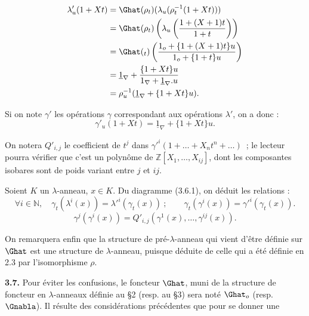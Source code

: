 \[
\begin{aligned}
\lambda'_u(1+Xt) &=\Ghat(\rho_t)(\lambda_u(\rho_t^{-1}(1+Xt)))\\
&=\Ghat(\rho_t)\left(\lambda_u\left(\frac{1+(X+1)t}{1+t}\right)\right)\\
&=\Ghat({}_t)\left(\frac{1_o+\{1+(X+1)t\}u}{1_o+\{1+t\}u}\right)\\
&=\underline{1}_\nabla+\frac{\{1+Xt\}u}{1_\nabla+\underline{1}_\nabla.u}\\
&=\rho_u^{-1}(\underline{1}_\nabla+\{1+Xt\}u).
\end{aligned}
\]

Si on note \(\gamma'\) les opérations \(\gamma\) correspondant aux opérations \(\lambda'\), on a donc :
\begin{equation}\tag{3.6.2}
  \gamma'_u(1+Xt)=\underline{1}_\nabla+\{1+Xt\}u .
\end{equation}

On notera \(Q'_{i,j}\) le coefficient de \(t^j\) dans \(\gamma'^i(1+\ldots+X_nt^n+\ldots)\)~; le lecteur pourra vérifier que c'est un polynôme de \(\mathbb Z[X_1,\ldots,X_{ij}]\), dont les composantes isobares sont de poids variant entre \(j\) et \(ij\).

Soient \(K\) un \(\lambda\)-anneau, \(x\in K\). Du diagramme (3.6.1), on déduit les relations :
\begin{equation}\tag{3.6.3}
  \forall i\in\mathbb N,\quad\gamma_t(\lambda^i(x))=\lambda'^i(\gamma_t(x))~;
  \qquad
  \gamma_t(\gamma^i(x))=\gamma'^i(\gamma_t(x)).
\end{equation}
\begin{equation}\tag{3.6.4}
  \gamma^j(\gamma^i(x))
  =Q'_{i,j}(\gamma^1(x),\ldots,\gamma^{ij}(x)).
\end{equation}

On remarquera enfin que la structure de pré-\(\lambda\)-anneau qui vient d'être définie sur \(\Ghat\) est une structure de \(\lambda\)-anneau, puisque déduite de celle qui a été définie en 2.3 par l'isomorphisme \(\rho\).

\textbf{3.7.} Pour éviter les confusions, le foncteur \(\Ghat\), muni de la structure de foncteur en \(\lambda\)-anneaux définie au §2 (resp. au §3) sera noté \(\Ghat_o\) (resp. \(\Gnabla\)). Il résulte des considérations précédentes que pour se donner une
